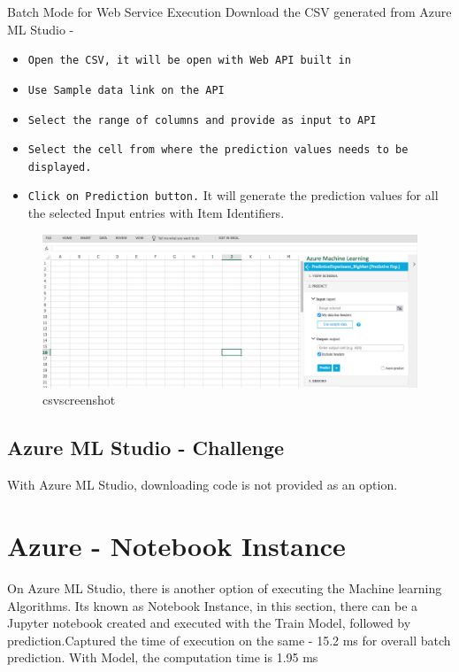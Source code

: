 Batch Mode for Web Service Execution
Download the CSV generated from Azure ML Studio -
\begin{itemize}
\item \verb|Open the CSV, it will be open with Web API built in|
\item \verb|Use Sample data link on the API|
\item \verb|Select the range of columns and provide as input to API|
\item \verb|Select the cell from where the prediction values needs to be displayed.|
\item \verb|Click on Prediction button.|
It will generate the prediction values for all the selected Input entries 
with Item Identifiers.
\end{itemize}

\begin{figure}[pic9]
 \centering\includegraphics[width=\columnwidth]{Images/mlstudio/csvscreenshot.png}
 \caption{csvscreenshot}\label{fig:csvscreenshot}
\end{figure}

\subsection{Azure ML Studio - Challenge}
With Azure ML Studio, downloading code is not provided as an option.

\section{Azure - Notebook Instance}

On Azure ML Studio, there is another option of executing the Machine 
learning Algorithms. Its known as Notebook Instance, in this section, 
there can be a Jupyter notebook created and executed with the Train Model, 
followed by prediction.Captured the time of execution on the same - 15.2 ms 
for overall batch prediction. With Model, the computation time is 1.95 ms

